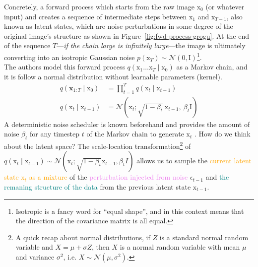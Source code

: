 Concretely, a forward process which starts from the raw image $\mathrm{x}_{0}$ (or whatever input) and creates a sequence of intermediate steps between $\mathrm{x}_{1}$ and $\mathrm{x}_{T-1}$, also known as latent states, which are noise perturbations in some degree of the original image's structure as shown in Figure~\ref{fig:fwd-process-grogu}. At the end of the sequence $T$---\textit{if the chain large is infinitely large}---the image is ultimately converting into an isotropic Gaussian noise $p(\mathrm{x}_{T})\sim \mathcal{N}(\mathrm{0}, \mathrm{I})$\footnote{Isotropic is a fancy word for ``equal shape'', and in this context means that the direction of the covariance matrix is all equal.}.\\

The authors model this forward process $q(\mathrm{x}_{1}\dots\mathrm{x}_{T}\mid\mathrm{x}_{0})$ as a Markov chain, and it is follow a normal distribution without learnable parameters (kernel). 
\begin{align}\label{eqn:forward-process}
q(\mathbf{x}_{1:T}\mid\mathrm{x}_0) &= \prod_{t=1}^{T}q(\mathrm{x}_t\mid\mathrm{x}_{t-1})
\\
q(\mathrm{x}_t\mid\mathrm{x}_{t-1}) &= \mathcal{N}(\mathrm{x}_t;\sqrt{1-\beta_{t}}~\mathrm{x}_{t-1},~ \beta_{t}\mathrm{I})
\end{align}
A deterministic noise scheduler is known beforehand and provides the
amount of noise $\beta_{t}$ for any timestep $t$ of the Markov chain to
generate $\mathrm{x}_{t}$ . How do we think about the latent space? The scale-location transformation\footnote{A quick recap about normal distributions, if $Z$ is a standard normal random variable and $X=\mu + \sigma Z$, then $X$ is a normal random variable with mean $\mu$ and variance $\sigma^2$, i.e. $X\sim\mathcal{N}(\mu, \sigma^2)$.} of $q(\mathrm{x}_{t}\mid\mathrm{x}_{t-1})\sim\mathcal{N}(\mathrm{x}_{t}; \sqrt{1-\beta_{t}} \mathrm{x}_{t-1}, \beta_{t}I)$ allows us to sample the \textcolor{orange}{current latent state $\mathrm{x}_{t}$ as a mixture} of the 
\textcolor{violet}{perturbation injected from noise} $\epsilon_{t-1}$ and \textcolor{teal}{the remaning structure
of the data} from the previous latent state $\mathrm{x}_{t-1}$.

